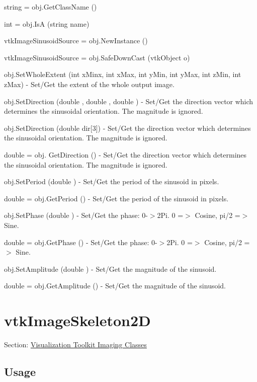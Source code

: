 \begin{DoxyItemize}
\item {\ttfamily string = obj.\-Get\-Class\-Name ()}  
\item {\ttfamily int = obj.\-Is\-A (string name)}  
\item {\ttfamily vtk\-Image\-Sinusoid\-Source = obj.\-New\-Instance ()}  
\item {\ttfamily vtk\-Image\-Sinusoid\-Source = obj.\-Safe\-Down\-Cast (vtk\-Object o)}  
\item {\ttfamily obj.\-Set\-Whole\-Extent (int x\-Minx, int x\-Max, int y\-Min, int y\-Max, int z\-Min, int z\-Max)} -\/ Set/\-Get the extent of the whole output image.  
\item {\ttfamily obj.\-Set\-Direction (double , double , double )} -\/ Set/\-Get the direction vector which determines the sinusoidal orientation. The magnitude is ignored.  
\item {\ttfamily obj.\-Set\-Direction (double dir\mbox{[}3\mbox{]})} -\/ Set/\-Get the direction vector which determines the sinusoidal orientation. The magnitude is ignored.  
\item {\ttfamily double = obj. Get\-Direction ()} -\/ Set/\-Get the direction vector which determines the sinusoidal orientation. The magnitude is ignored.  
\item {\ttfamily obj.\-Set\-Period (double )} -\/ Set/\-Get the period of the sinusoid in pixels.  
\item {\ttfamily double = obj.\-Get\-Period ()} -\/ Set/\-Get the period of the sinusoid in pixels.  
\item {\ttfamily obj.\-Set\-Phase (double )} -\/ Set/\-Get the phase\-: 0-\/$>$2\-Pi. 0 =$>$ Cosine, pi/2 =$>$ Sine.  
\item {\ttfamily double = obj.\-Get\-Phase ()} -\/ Set/\-Get the phase\-: 0-\/$>$2\-Pi. 0 =$>$ Cosine, pi/2 =$>$ Sine.  
\item {\ttfamily obj.\-Set\-Amplitude (double )} -\/ Set/\-Get the magnitude of the sinusoid.  
\item {\ttfamily double = obj.\-Get\-Amplitude ()} -\/ Set/\-Get the magnitude of the sinusoid.  
\end{DoxyItemize}\hypertarget{vtkimaging_vtkimageskeleton2d}{}\section{vtk\-Image\-Skeleton2\-D}\label{vtkimaging_vtkimageskeleton2d}
Section\-: \hyperlink{sec_vtkimaging}{Visualization Toolkit Imaging Classes} \hypertarget{vtkwidgets_vtkxyplotwidget_Usage}{}\subsection{Usage}\label{vtkwidgets_vtkxyplotwidget_Usage}
